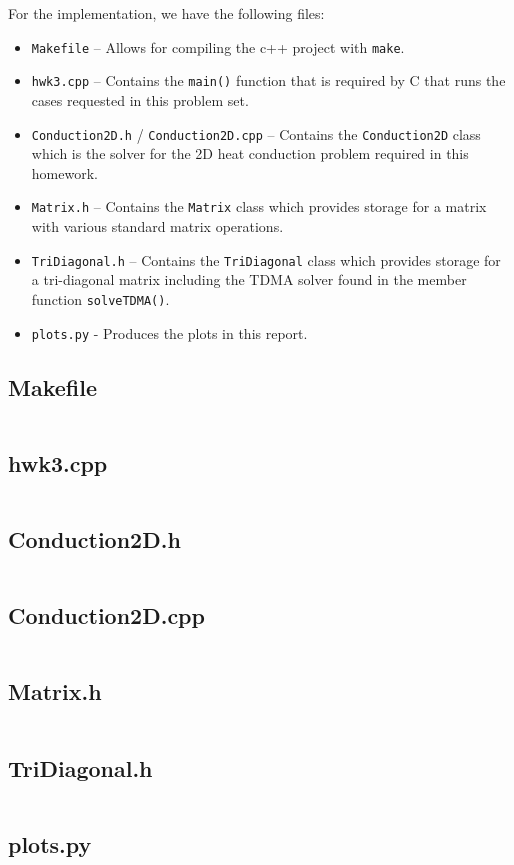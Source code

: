 \documentclass{article}
\begin{document}
For the implementation, we have the following files:
\begin{itemize}
	\item \texttt{Makefile} -- Allows for compiling the c++ project with \texttt{make}.
	\item \texttt{hwk3.cpp} -- Contains the \texttt{main()} function that is required by C that runs the cases requested in this problem set.
	\item \texttt{Conduction2D.h} / \texttt{Conduction2D.cpp} -- Contains the \texttt{Conduction2D} class which is the solver for the 2D heat conduction problem required in this homework.
	\item \texttt{Matrix.h} -- Contains the \texttt{Matrix} class which provides storage for a matrix with various standard matrix operations.
	\item \texttt{TriDiagonal.h} -- Contains the \texttt{TriDiagonal} class which provides storage for a tri-diagonal matrix including the TDMA solver found in the member function \texttt{solveTDMA()}.
	\item \texttt{plots.py} - Produces the plots in this report.
\end{itemize}

\subsection*{Makefile}
\inputminted[fontsize=\small]{Makefile}{../Makefile}

\subsection*{hwk3.cpp}
\inputminted[fontsize=\small]{c++}{../hwk3.cpp}

\subsection*{Conduction2D.h}
\inputminted[fontsize=\small]{c++}{../Conduction2D.h}

\subsection*{Conduction2D.cpp}
\inputminted[fontsize=\small]{c++}{../Conduction2D.cpp}

\subsection*{Matrix.h}
\inputminted[fontsize=\small]{c++}{../Matrix.h}

\subsection*{TriDiagonal.h}
\inputminted[fontsize=\small]{c++}{../TriDiagonal.h}

\subsection*{plots.py}
\inputminted[fontsize=\small]{python}{../plots.py}
\end{document}
